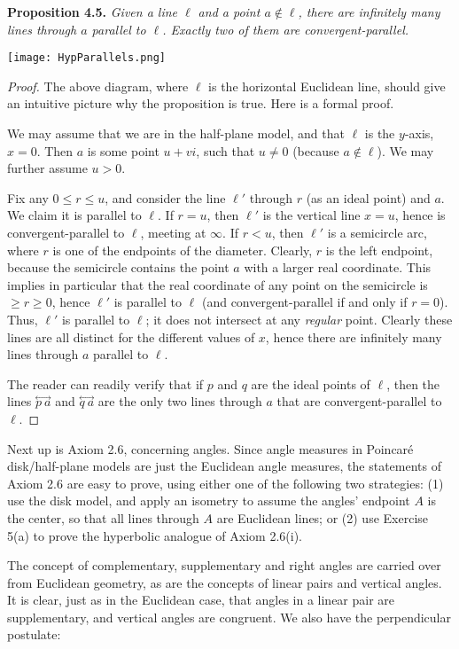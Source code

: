 \documentclass[leqno]{book}
\begin{document}
\noindent\textbf{Proposition 4.5.} \emph{Given a line $\ell$ and a point $a\notin\ell$, there are infinitely many lines through $a$ parallel to $\ell$.  Exactly two of them are convergent-parallel.}
\begin{center}\texttt{[image: HypParallels.png]}\end{center}
\begin{proof}
The above diagram, where $\ell$ is the horizontal Euclidean line, should give an intuitive picture why the proposition is true.  Here is a formal proof.

We may assume that we are in the half-plane model, and that $\ell$ is the $y$-axis, $x=0$.  Then $a$ is some point $u+vi$, such that $u\ne 0$ (because $a\notin\ell$).  We may further assume $u>0$.

Fix any $0\leqslant r\leqslant u$, and consider the line $\ell'$ through $r$ (as an ideal point) and $a$.  We claim it is parallel to $\ell$.  If $r=u$, then $\ell'$ is the vertical line $x=u$, hence is convergent-parallel to $\ell$, meeting at $\infty$.  If $r<u$, then $\ell'$ is a semicircle arc, where $r$ is one of the endpoints of the diameter.  Clearly, $r$ is the left endpoint, because the semicircle contains the point $a$ with a larger real coordinate.  This implies in particular that the real coordinate of any point on the semicircle is $\geqslant r\geqslant 0$, hence $\ell'$ is parallel to $\ell$ (and convergent-parallel if and only if $r=0$).  Thus, $\ell'$ is parallel to $\ell$; it does not intersect at any \emph{regular} point.  Clearly these lines are all distinct for the different values of $x$, hence there are infinitely many lines through $a$ parallel to $\ell$.

The reader can readily verify that if $p$ and $q$ are the ideal points of $\ell$, then the lines $\overset{\longleftrightarrow}{p~a}$ and $\overset{\longleftrightarrow}{q~a}$ are the only two lines through $a$ that are convergent-parallel to $\ell$.
\end{proof}
\noindent Next up is Axiom 2.6, concerning angles.  Since angle measures in Poincar\'e disk/half-plane models are just the Euclidean angle measures, the statements of Axiom 2.6 are easy to prove, using either one of the following two strategies: (1) use the disk model, and apply an isometry to assume the angles' endpoint $A$ is the center, so that all lines through $A$ are Euclidean lines; or (2) use Exercise 5(a) to prove the hyperbolic analogue of Axiom 2.6(i).

The concept of complementary, supplementary and right angles are carried over from Euclidean geometry, as are the concepts of linear pairs and vertical angles.  It is clear, just as in the Euclidean case, that angles in a linear pair are supplementary, and vertical angles are congruent.  We also have the perpendicular postulate:\\
\end{document}
